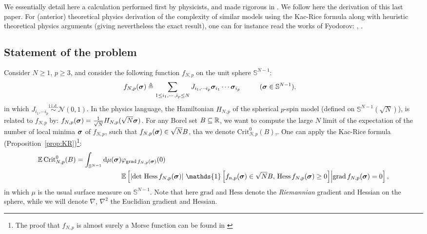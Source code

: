 \documentclass[amsmath,amssymb,nofootinbib,prd]{article}
\begin{document}
	We essentially detail here a calculation performed first by physicists, and made rigorous in \cite{auffinger2013random}. 
	We follow here the derivation of this last paper. For (anterior) theoretical physics derivation of the complexity of similar models using the Kac-Rice formula along with heuristic theoretical physics arguments (giving nevertheless the exact result), one can for instance read the works of Fyodorov: \cite{fyodorov2004complexity}, \cite{fyodorov2007replica}. 
	
	\subsection{Statement of the problem}
	Consider $N \geq 1$, $p \geq 3$, and consider the following function $f_{N,p}$ on the unit sphere $\mathbb{S}^{N-1}$:
	\begin{align}
	f_{N,p}({\boldsymbol{\sigma}}) &\triangleq \sum_{1 \leq i_1,\cdots,i_p \leq N} J_{i_1,\cdots i_p} {\boldsymbol{\sigma}}_{i_1} \cdots {\boldsymbol{\sigma}}_{i_p} \hspace{1cm} ({\boldsymbol{\sigma}} \in \mathbb{S}^{N-1}) ,
	\end{align}
	in which $J_{i_1,\cdots i_p} \overset{\mathrm{i.i.d.}}{\sim} \mathcal{N}(0,1)$.
	In the physics language, the Hamiltonian $H_{N,p}$ of the spherical $p$-spin model (defined on $\mathbb{S}^{N-1}(\sqrt{N})$), is related to $f_{N,p}$ by: $f_{N,p}({\boldsymbol{\sigma}}) = \frac{1}{\sqrt{N}} H_{N,p}(\sqrt{N}{\boldsymbol{\sigma}})$.
	For any Borel set $B \subseteq \mathbb{R}$, we want to compute the large $N$ limit of the expectation of the number of local minima ${\boldsymbol{\sigma}}$ of $f_{N,p}$, such that $f_{N,p}({\boldsymbol{\sigma}}) \in \sqrt{N} B$, tha we denote $\mathrm{Crit}_{N,p}^0(B)$,. 
	One can apply the Kac-Rice formula (Proposition~\ref{prop:KR})\footnote{The proof that $f_{N,p}$ is almost surely a Morse function can be found in \cite{auffinger2013random}}:
	\begin{align*}
	\EE \, \mathrm{Crit}_{N,p}^0(B) = \int_{\mathbb{S}^{N-1}} \mathrm{d}\mu(\bsigma) &\varphi_{\mathrm{grad}\, f_{N,p}(\bsigma)}(0)  \\ 
	&\EE \left[\left|\det \, \mathrm{Hess}\, f_{N,p}(\bsigma)\right| \, \mathds{1}\left[f_{n,p}(\bsigma) \in \sqrt{N} B,\, \mathrm{Hess}\, f_{N,p}(\bsigma) \geq 0\right] \middle| \mathrm{grad}\, f_{N,p}(\bsigma) = 0 \right],
	\end{align*}
	in which $\mu$ is the usual surface measure on $\mathbb{S}^{N-1}$. Note that here $\mathrm{grad}$ and $\mathrm{Hess}$ denote the \emph{Riemannian} gradient and Hessian on the sphere, while we will denote $\nabla$, $\nabla^2$ the Euclidian gradient and Hessian. 
	
\end{document}
